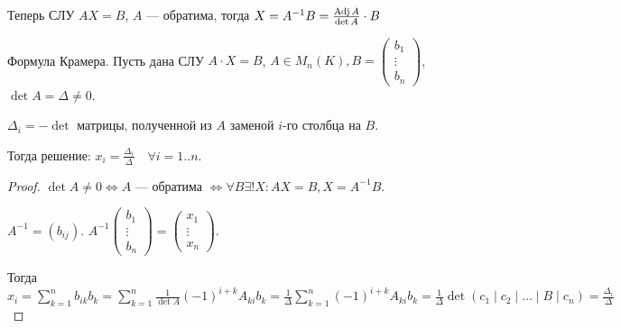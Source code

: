 \begin{remark}
    Теперь СЛУ $AX = B$,  $A$ --- обратима, тогда  $X = A^{-1}B = \frac{\operatorname{Adj} A}{\det A} \cdot B$
\end{remark}
\begin{theorem}
    Формула Крамера. Пусть дана СЛУ $A \cdot X = B$,  $A \in M_n(K), B = \begin{pmatrix} b_1 \\ \vdots \\ b_n \end{pmatrix}$, $\det A = \Delta \neq 0$.

     $\Delta_i = -\det$ матрицы, полученной из  $A$ заменой  $i$-го столбца на  $B$. 

     Тогда решение:  $x_i = \frac{\Delta_i}{\Delta} \quad \forall i=1..n$.
\end{theorem}
\begin{proof}
    $\det A \neq 0 \iff A$ --- обратима  $\iff \forall B \exists! X\!: AX = B, X = A^{-1}B$.

    $A^{-1} = (b_{ij})$.  $A^{-1} \begin{pmatrix} b_1 \\ \vdots \\ b_n \end{pmatrix} = \begin{pmatrix} x_1 \\ \vdots \\ x_n \end{pmatrix} $.

    Тогда $x_i = \sum\limits_{k=1}^n b_{ik}b_k = \sum\limits_{k=1}^n \frac{1}{\det A}(-1)^{i+k} A_{ki} b_k = \frac{1}{\Delta}\sum\limits_{k=1}^n (-1)^{i+k} A_{ki} b_k = \frac{1}{\Delta} \det (c_1 \mid c_2 \mid \ldots \mid B \mid c_n) = \frac{\Delta_i}{\Delta}$ 
\end{proof}

